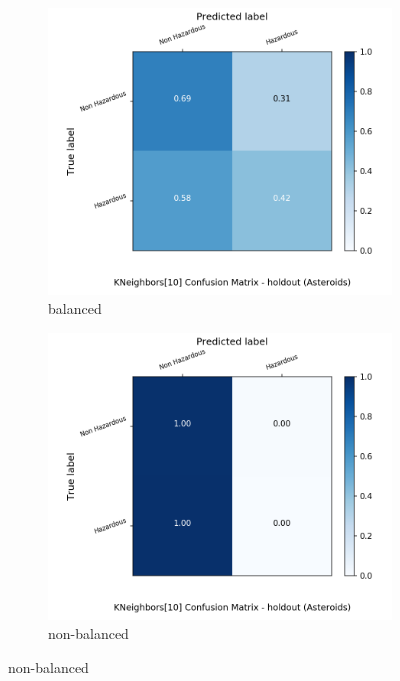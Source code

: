 \begin{figure}[H]
	\centering
	\begin{subfigure}{.5\textwidth}
		\centering
		\includegraphics[width=1.1\textwidth]{Plots/asteroids/asteroids_KNeighbors_10_balance_True_holdout.png}
		\caption{balanced}
	\end{subfigure}%
	\begin{subfigure}{.5\textwidth}
		\centering
		\includegraphics[width=1.1\textwidth]{Plots/asteroids/asteroids_KNeighbors_10_balance_False_holdout.png}
		\caption{non-balanced}
	\end{subfigure}
\end{figure}

